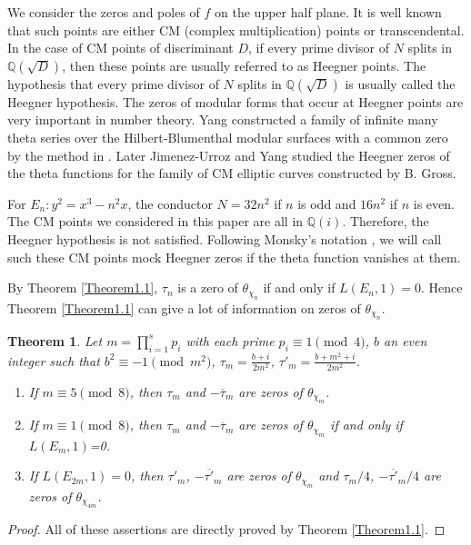 \documentclass[11pt, reqno]{amsart}
\theoremstyle{plain}
\newtheorem{theorem}{Theorem}[section]
\theoremstyle{definition}
\numberwithin{equation}{section}
\begin{document}
We consider the zeros and   poles of $f$ on the upper half plane. 
 It is well known that such points are either CM (complex multiplication) points  or transcendental. In the case of CM points  of discriminant $D$, if every prime divisor of $N$  splits in $\mathbb{Q}(\sqrt{D})$, then these points are usually  referred to as Heegner points. The hypothesis that every prime divisor of $N$  splits in $\mathbb{Q}(\sqrt{D})$ is usually called the Heegner hypothesis.  
The zeros of modular forms that occur at Heegner points are very important in number theory.  
  Yang \cite{Y2.5}  constructed a family of infinite many theta series over the Hilbert-Blumenthal modular surfaces with a common zero by the method in \cite{V4}. Later  Jimenez-Urroz and Yang \cite{Y1} studied the  Heegner zeros of the theta functions for the family of CM elliptic curves constructed by B. Gross.




For $E_n: y^2=x^3-n^2x$, the conductor
$N=32n^2$ if $n$ is odd and $16n^2$ if $n$ is even. The CM points we considered in this paper are all in $\mathbb{Q}(i)$. Therefore,  the Heegner hypothesis is not satisfied. Following Monsky's notation \cite{Monsky}, we will call such these CM points mock Heegner zeros if the theta function vanishes at them. 

 By  Theorem \ref{Theorem1.1}, 
$\tau_n$ is a  zero of $\theta_{\chi_n}$  if and only if $L(E_n,1)=0$. Hence Theorem \ref{Theorem1.1} can give a lot of information on  zeros of $\theta_{\chi_n}$.

\begin{theorem}\label{Theorem8.3}
Let  $m=\prod_{i=1}^s p_i$ with  each prime $p_i\equiv1\pmod{4}$, $b$  an even integer such that $b^2\equiv -1\pmod{m^2}$, $\tau_m=\frac{b+i}{2
m^2}$, $\tau'_{m}=\frac{b+m^2+i}{2
m^2}$.  
\begin{enumerate}
    \item If $m\equiv 5\pmod{8}$, then $\tau_m$ and  $-\overline{\tau}_m$ are  zeros of $\theta_{\chi_m}$. 
    \item If  $m\equiv 1\pmod{8}$, then $\tau_m$ and  $-\overline{\tau}_m$ are  zeros of $\theta_{\chi_m}$ if and only if $L(E_m,1)$=0.
    \item If $L(E_{2m},1)=0$, then $\tau'_{m}$, $-\overline{\tau'}_{m}$ are  zeros of $\theta_{\chi_m}$ and $\tau_m/4$,  $-\overline{\tau'}_{m}/4$ are  zeros of $\theta_{\chi_{4m}}$.
\end{enumerate}
\end{theorem}
\begin{proof}
All of these assertions are directly proved by Theorem \ref{Theorem1.1}.
\end{proof}
\end{document}
